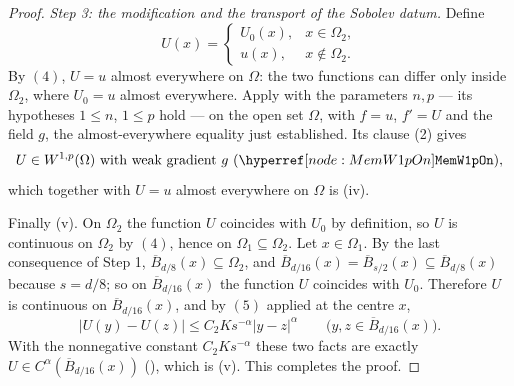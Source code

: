 \begin{proof}
\emph{Step 3: the modification and the transport of the Sobolev datum.}  Define
\[
U(x)=\begin{cases}U_0(x),&x\in\Omega_2,\\ u(x),&x\notin\Omega_2 .\end{cases}
\]
By $(4)$, $U=u$ almost everywhere on $\Omega$: the two functions can differ
only inside $\Omega_2$, where $U_0=u$ almost everywhere.  Apply
 with the parameters $n,p$ --- its hypotheses
$1\le n$, $1\le p$ hold --- on the open set $\Omega$, with $f=u$, $f'=U$ and
the field $g$, the almost-everywhere equality just established.  Its clause (2)
gives
\[
U\in W^{1,p}(\Omega)\ \text{with weak gradient }g\ (\noderef{MemW1pOn}),
\]
which together with $U=u$ almost everywhere on $\Omega$ is (iv).

Finally (v).  On $\Omega_2$ the function $U$ coincides with $U_0$ by
definition, so $U$ is continuous on $\Omega_2$ by $(4)$, hence on
$\Omega_1\subseteq\Omega_2$.  Let $x\in\Omega_1$.  By the last consequence of
Step 1, $\overline B_{d/8}(x)\subseteq\Omega_2$, and
$\overline B_{d/16}(x)=\overline B_{s/2}(x)\subseteq\overline B_{d/8}(x)$
because $s=d/8$; so on $\overline B_{d/16}(x)$ the function $U$ coincides with
$U_0$.  Therefore $U$ is continuous on $\overline B_{d/16}(x)$, and by $(5)$
applied at the centre $x$,
\[
|U(y)-U(z)|\le C_2Ks^{-\alpha}|y-z|^\alpha
\qquad\bigl(y,z\in\overline B_{d/16}(x)\bigr).
\]
With the nonnegative constant $C_2Ks^{-\alpha}$ these two facts are exactly
$U\in C^\alpha(\overline B_{d/16}(x))$ (), which is (v).
This completes the proof.
\end{proof}
